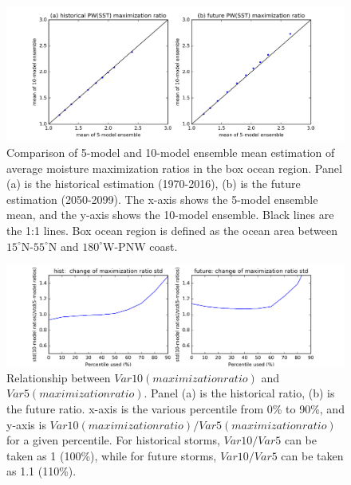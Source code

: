 \begin{figure}[htbp]
	\includegraphics[width=\linewidth]{pics/ch5/figS2.png}
	\caption{Comparison of 5-model and 10-model ensemble mean estimation of average moisture maximization ratios in the box ocean region. Panel (a) is the historical estimation (1970-2016), (b) is the future estimation (2050-2099). The x-axis shows the 5-model ensemble mean, and the y-axis shows the 10-model ensemble. Black lines are the 1:1 lines. Box ocean region is defined as the ocean area between $15^{\circ}$N-$55^{\circ}$N and $180^{\circ}$W-PNW coast.}
	\label{fig:5-S2}
\end{figure}

\begin{figure}[htbp]
	\includegraphics[width=\linewidth]{pics/ch5/figS3.png}
	\caption{Relationship between $Var10(maximization ratio)$ and $Var5(maximization ratio)$. Panel (a) is the historical ratio, (b) is the future ratio. x-axis is the various percentile from 0\% to 90\%, and y-axis is $Var10(maximization ratio)/Var5(maximization ratio)$ for a given percentile. For historical storms, $Var10/Var5$ can be taken as 1 (100\%), while for future storms, $Var10/Var5$ can be taken as 1.1 (110\%).}
	\label{fig:5-S3}
\end{figure}